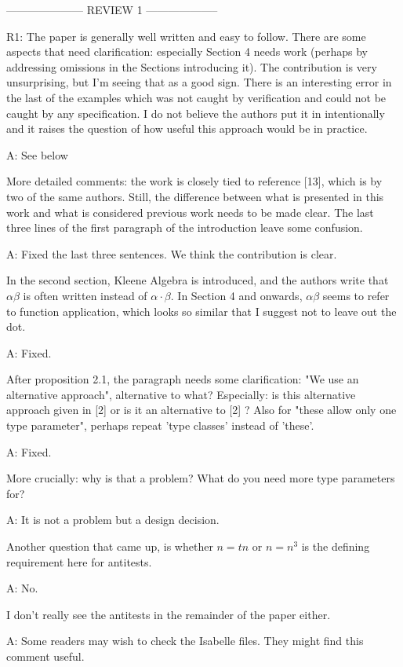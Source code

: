 \documentclass[envcountsame,envcountsect]{llncs}
\begin{document}
--------------------- REVIEW 1 --------------------


R1: The paper is generally well written and easy to follow. There are some aspects that need clarification: especially Section 4 needs work (perhaps by addressing omissions in the Sections introducing it). The contribution is very unsurprising, but I'm seeing that as a good sign. There is an interesting error in the last of the examples which was not caught by verification and could not be caught by any specification. I do not believe the authors put it in intentionally and it raises the question of how useful this approach would be in practice.

A: See below

More detailed comments:
the work is closely tied to reference [13], which is by two of the same authors. Still, the difference between what is presented in this work and what is considered previous work needs to be made clear. The last three lines of the first paragraph of the introduction leave some confusion.

A: Fixed the last three sentences. We think the contribution is clear.

In the second section, Kleene Algebra is introduced, and the authors write that $\alpha\beta$ is often written instead of $\alpha\cdot\beta$. In Section 4 and onwards, $\alpha\beta$ seems to refer to function application, which looks so similar that I suggest not to leave out the dot.

A: Fixed.

After proposition 2.1, the paragraph needs some clarification: "We use an alternative approach", alternative to what? Especially: is this alternative approach given in [2] or is it an alternative to [2] ?
Also for "these allow only one type parameter", perhaps repeat 'type classes' instead of 'these'. 

A: Fixed.

More crucially: why is that a problem? What do you need more type parameters for?

A: It is not a problem but a design decision. 

Another question that came up, is whether $n = tn$ or $n=n^3$ is the defining requirement here for antitests.

A: No. 

I don't really see the antitests in the remainder of the paper either.

A: Some readers may wish to check the Isabelle files. They might find this comment useful.
\end{document}
